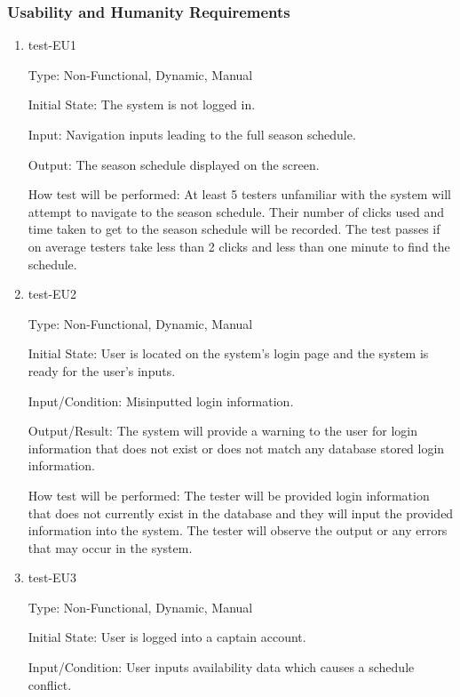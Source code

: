 \documentclass[12pt, titlepage]{article}
\begin{document}
\subsubsection{Usability and Humanity Requirements}

\begin{enumerate}

  \item{test-EU1\\}

  Type: Non-Functional, Dynamic, Manual

  Initial State: The system is not logged in.

  Input: Navigation inputs leading to the full season schedule.

  Output: The season schedule displayed on the screen.

  How test will be performed: At least 5 testers unfamiliar with the system will
  attempt to navigate to the season schedule. Their number of clicks used and
  time taken to get to the season schedule will be recorded. The test passes
  if on average testers take less than 2 clicks and less than one minute to
  find the schedule.

  \item{test-EU2\\}

  Type: Non-Functional, Dynamic, Manual

  Initial State: User is located on the system's login page and the system is ready
  for the user's inputs.

  Input/Condition: Misinputted login information.

  Output/Result: The system will provide a warning to the user for login information that
  does not exist or does not match any database stored login information.

  How test will be performed: The tester will be provided login information that does not
  currently exist in the database and they will input the provided information into the
  system. The tester will observe the output or any errors that may occur in the system.

  \item{test-EU3\\}
  
  Type: Non-Functional, Dynamic, Manual
            
  Initial State: User is logged into a captain account.
            
  Input/Condition: User inputs availability data which causes a schedule conflict.
            

\end{enumerate}
\end{document}
